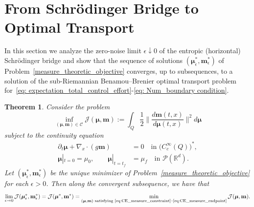 \documentclass{amsart}
\newtheorem{theorem}{Theorem}[section]
\numberwithin{equation}{section}
\begin{document}
\section{From Schr\"odinger Bridge to Optimal Transport}\label{sec: Limiting Section}
In this section we analyze the zero-noise limit $\epsilon \downarrow 0$ of the entropic (horizontal) Schr\"odinger bridge and show that the sequence of solutions $(\boldsymbol{\mu}_\epsilon^*, \mathbf{m}_\epsilon^*)$ of Problem~\eqref{measure_theoretic_objective} converges, up to subsequences, to a solution of the sub-Riemannian Benamou--Brenier optimal transport problem for~\eqref{eq: expectation_total_control_effort}-\eqref{eq: Num_boundary condition}.
\begin{theorem}\label{thm:Gamma}
Consider the problem
\begin{equation}\label{measure_theoretic_objective2}
\inf_{(\boldsymbol\mu, \mathbf m)\in\mathcal C} 
\mathcal{J}(\boldsymbol\mu, \mathbf m):=
\int_Q \frac12\Big\|\frac{d\mathbf m(t,x)}{d\boldsymbol\mu(t,x)}\Big\|^2 d\boldsymbol\mu%
\end{equation}
subject to the continuity equation
\begin{subequations}\label{eq:CE_measure_unref}
\begin{align}
\partial_t \boldsymbol\mu + \nabla_x \cdot \left(g\mathbf m\right) &= 0 \quad \text{in } \bigl(C_c^\infty(Q)\bigr)^*, \label{eq:CE_measure_constraint}\\
\boldsymbol\mu|_{t=0} = \mu_0, \qquad \boldsymbol\mu|_{t=t_f} &= \mu_f \quad \text{in } \mathcal{P}(\mathbb{R}^d). \label{eq:CE_measure_endpoint}
\end{align}
\end{subequations}
 Let $(\boldsymbol{\mu}_\epsilon^*, \mathbf{m}_\epsilon^*)$ be the unique minimizer of Problem~\eqref{measure_theoretic_objective} for each $\epsilon > 0$. Then along the convergent subsequence, we have that
        \begin{equation}\label{eq:aux1}
            \lim_{\epsilon \to 0} \mathcal{J}(\boldsymbol{\mu}_\epsilon^*, \mathbf{m}_\epsilon^*) = \mathcal{J}(\boldsymbol{\mu}^*, \mathbf{m}^*) = \min_{(\boldsymbol\mu,\mathbf m)\text{ satisfying \eqref{eq:CE_measure_constraint}--\eqref{eq:CE_measure_endpoint}}} \mathcal J(\boldsymbol\mu,\mathbf m).
        \end{equation}
\end{theorem}
\end{document}
